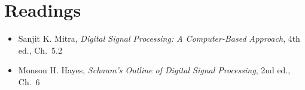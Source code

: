 \documentclass[handout_subfiles_root.tex]{subfiles}
\begin{document}
\section*{Readings}
\begin{itemize}
  \item Sanjit K. Mitra, \textit{Digital Signal Processing: A Computer-Based Approach}, 4th ed., Ch.\ 5.2
  \item Monson H. Hayes, \textit{Schaum's Outline of Digital Signal Processing}, 2nd ed., Ch.\ 6
\end{itemize}

\HandoutAppendixListStart
\HandoutAppendixListEnd

\end{document}
